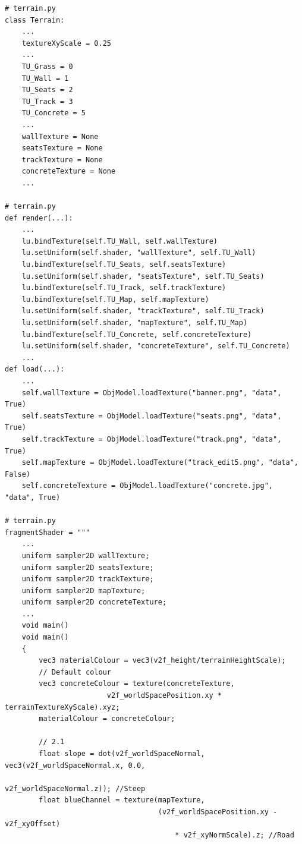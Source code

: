 \documentclass[a4 paper, 12pt]{article}
\begin{document}
\begin{lstlisting} 
# terrain.py
class Terrain:
    ...
    textureXyScale = 0.25
    ...
    TU_Grass = 0
    TU_Wall = 1
    TU_Seats = 2
    TU_Track = 3   
    TU_Concrete = 5
    ...
    wallTexture = None
    seatsTexture = None
    trackTexture = None    
    concreteTexture = None
    ...

# terrain.py  
def render(...):
    ...
    lu.bindTexture(self.TU_Wall, self.wallTexture)
    lu.setUniform(self.shader, "wallTexture", self.TU_Wall)
    lu.bindTexture(self.TU_Seats, self.seatsTexture)
    lu.setUniform(self.shader, "seatsTexture", self.TU_Seats)
    lu.bindTexture(self.TU_Track, self.trackTexture)
    lu.bindTexture(self.TU_Map, self.mapTexture)
    lu.setUniform(self.shader, "trackTexture", self.TU_Track)
    lu.setUniform(self.shader, "mapTexture", self.TU_Map)
    lu.bindTexture(self.TU_Concrete, self.concreteTexture)
    lu.setUniform(self.shader, "concreteTexture", self.TU_Concrete)
    ...  
def load(...):
    ...
    self.wallTexture = ObjModel.loadTexture("banner.png", "data", True)
    self.seatsTexture = ObjModel.loadTexture("seats.png", "data", True)
    self.trackTexture = ObjModel.loadTexture("track.png", "data", True)
    self.mapTexture = ObjModel.loadTexture("track_edit5.png", "data", False)
    self.concreteTexture = ObjModel.loadTexture("concrete.jpg", "data", True)

# terrain.py 
fragmentShader = """
    ...
    uniform sampler2D wallTexture;
    uniform sampler2D seatsTexture;   
    uniform sampler2D trackTexture;
    uniform sampler2D mapTexture;
    uniform sampler2D concreteTexture;
    ...  
    void main() 
    void main() 
    {
        vec3 materialColour = vec3(v2f_height/terrainHeightScale);
        // Default colour 
        vec3 concreteColour = texture(concreteTexture, 
                        v2f_worldSpacePosition.xy * terrainTextureXyScale).xyz;
        materialColour = concreteColour;

        // 2.1                 
        float slope = dot(v2f_worldSpaceNormal, vec3(v2f_worldSpaceNormal.x, 0.0, 
                                                v2f_worldSpaceNormal.z)); //Steep 
        float blueChannel = texture(mapTexture, 
                                    (v2f_worldSpacePosition.xy - v2f_xyOffset) 
                                        * v2f_xyNormScale).z; //Road


\end{lstlisting}
\end{document}
